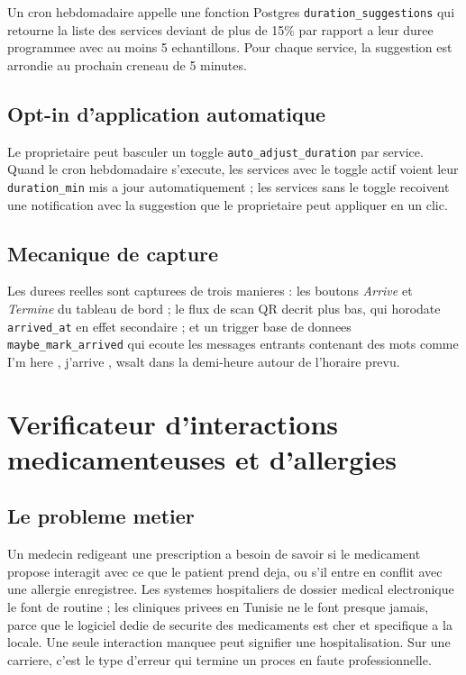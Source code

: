 Un cron hebdomadaire appelle une fonction Postgres
\texttt{duration\_suggestions} qui retourne la liste des services
deviant de plus de 15\% par rapport a leur duree programmee avec au
moins 5 echantillons. Pour chaque service, la suggestion est arrondie
au prochain creneau de 5 minutes.

\subsection{Opt-in d'application automatique}
Le proprietaire peut basculer un toggle \texttt{auto\_adjust\_duration}
par service. Quand le cron hebdomadaire s'execute, les services avec
le toggle actif voient leur \texttt{duration\_min} mis a jour
automatiquement ; les services sans le toggle recoivent une
notification avec la suggestion que le proprietaire peut appliquer
en un clic.

\subsection{Mecanique de capture}
Les durees reelles sont capturees de trois manieres : les boutons
\emph{Arrive} et \emph{Termine} du tableau de bord ; le flux de scan
QR decrit plus bas, qui horodate \texttt{arrived\_at} en effet
secondaire ; et un trigger base de donnees
\texttt{maybe\_mark\_arrived} qui ecoute les messages entrants
contenant des mots comme \og I'm here \fg{}, \og j'arrive \fg{},
\og wsalt \fg{} dans la demi-heure autour de l'horaire prevu.

\section{Verificateur d'interactions medicamenteuses et d'allergies}

\subsection{Le probleme metier}
Un medecin redigeant une prescription a besoin de savoir si le
medicament propose interagit avec ce que le patient prend deja, ou
s'il entre en conflit avec une allergie enregistree. Les systemes
hospitaliers de dossier medical electronique le font de routine ;
les cliniques privees en Tunisie ne le font presque jamais, parce
que le logiciel dedie de securite des medicaments est cher et
specifique a la locale. Une seule interaction manquee peut signifier
une hospitalisation. Sur une carriere, c'est le type d'erreur qui
termine un proces en faute professionnelle.

